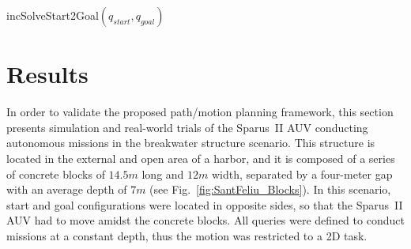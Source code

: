 \begin{algorithm}[htbp]
	\DontPrintSemicolon


 \caption{incSolveStart2Goal$\left(q_{start},q_{goal}\right)$}
 \label{alg:PlanningFramework}
\end{algorithm}

\section{Results}
\label{sec:PlanningOnlineResults}

In order to validate the proposed path/motion planning framework, this section
presents simulation and real-world trials of the Sparus~II \ac{AUV} conducting
autonomous missions in the breakwater structure scenario. This structure is
located in the external and open area of a harbor, and it is composed
 of a series of concrete blocks of $14.5m$ long and $12m$ width, separated by a
four-meter gap with an average depth of $7m$ (see
Fig.~\ref{fig:SantFeliu_Blocks}). In this scenario, start and goal
configurations were located in opposite sides, so that the Sparus~II \ac{AUV}
had to move amidst the concrete blocks. All queries were defined to conduct
missions at a constant depth, thus the motion was restricted to a \ac{2D} task.


